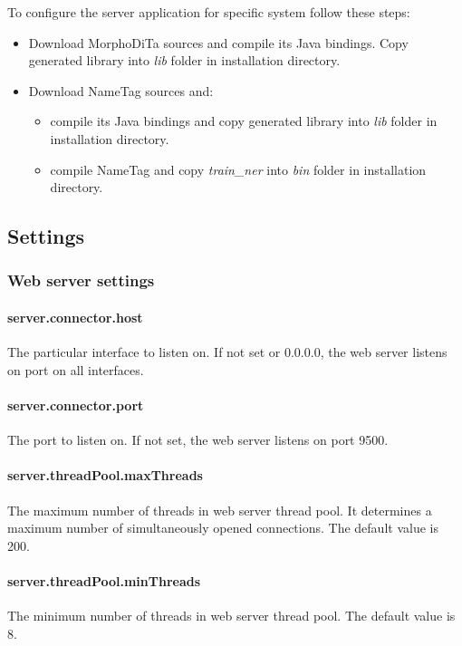 To configure the server application for specific system follow these steps:
\begin{itemize}
\item Download MorphoDiTa sources and compile its Java bindings. Copy generated
library into \emph{lib} folder in installation directory.
\item Download NameTag sources and:
	\begin{itemize}
	\item compile its Java bindings and copy generated library into \emph{lib}
	folder in installation directory.
	\item compile NameTag and copy \emph{train\_ner} into \emph{bin} folder in
	installation directory.
	\end{itemize}
\end{itemize}

\subsection{Settings}
\label{sec:ServerSettings}

\subsubsection{Web server settings}
\label{sssec:WebServerSettings}

\paragraph{server.connector.host}
The particular interface to listen on. If not set or 0.0.0.0, the web server
listens on port on all interfaces.

\paragraph{server.connector.port}
The port to listen on. If not set, the web server listens on port 9500.

\paragraph{server.threadPool.maxThreads}
The maximum number of threads in web server thread pool. It determines a maximum
number of simultaneously opened connections. The default value is 200.

\paragraph{server.threadPool.minThreads}
The minimum number of threads in web server thread pool. The default value is 8.

